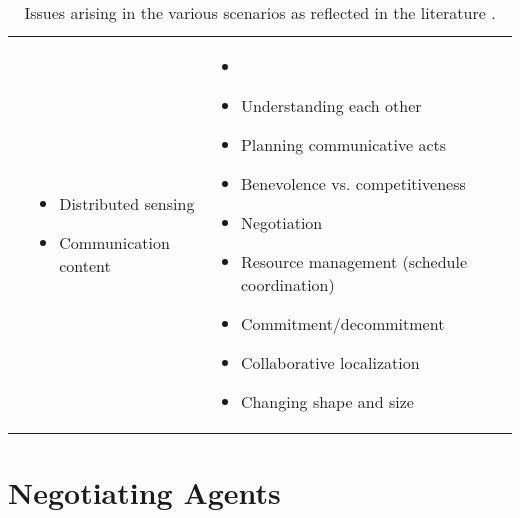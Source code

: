 \documentclass[ThesisDoc]{subfiles}
\begin{document}
\begin{table}
\begin{tabular}{P{0.1\textwidth} P{0.3\textwidth}|P{0.4\textwidth}}
    \begin{minipage}{0.1\textwidth}
    \end{minipage}
                      & \begin{minipage}{0.3\textwidth}
                        \footnotesize\begin{itemize}[leftmargin=5px, rightmargin=0px]
                          \item Distributed sensing
                          \item Communication content
                        \end{itemize}\end{minipage}
                      & \begin{minipage}{0.4\textwidth}
                        \footnotesize\begin{itemize}[leftmargin=10px, rightmargin=0px]
                          \item[]
                          \item Understanding each other
                          \item Planning communicative acts
                          \item Benevolence vs. competitiveness
                          \item Negotiation
                          \item Resource management (schedule coordination)
                          \item Commitment/decommitment
                          \item Collaborative localization
                          \item Changing shape and size
                        \end{itemize}\end{minipage}
  \end{tabular}
  \caption{Issues arising in the various scenarios as reflected in the literature
          \cite[Table~2]{MAS-Survey}.}
  \label{table:MAS-Table}
\end{table}


\section{Negotiating Agents}
\label{sec:NegotiatingAgents}
\end{document}
